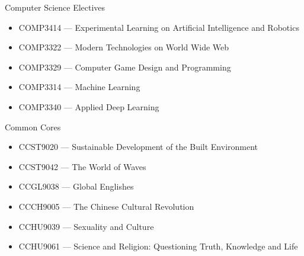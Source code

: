 \documentclass{article}
\begin{document}
Computer Science Electives
\begin{itemize}
    \item[] COMP3414 --- Experimental Learning on Artificial Intelligence and Robotics
    \item[] COMP3322 --- Modern Technologies on World Wide Web
    \item[] COMP3329 --- Computer Game Design and Programming
    \item[] COMP3314 --- Machine Learning
    \item[] COMP3340 --- Applied Deep Learning
\end{itemize}

Common Cores
\begin{itemize}
    \item[] CCST9020 --- Sustainable Development of the Built Environment
    \item[] CCST9042 --- The World of Waves
    \item[] CCGL9038 --- Global Englishes
    \item[] CCCH9005 --- The Chinese Cultural Revolution
    \item[] CCHU9039 --- Sexuality and Culture
    \item[] CCHU9061 --- Science and Religion: Questioning Truth, Knowledge and Life
\end{itemize}
\end{document}
